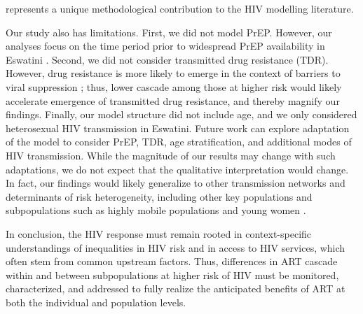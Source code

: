 represents a unique methodological contribution to the HIV modelling literature.
\par
Our study also has limitations.
First, we did not model PrEP.
However, our analyses focus on the time period
prior to widespread PrEP availability in Eswatini \cite{EswIBBS2022}.
Second, we did not consider transmitted drug resistance (TDR).
However, drug resistance is more likely to emerge
in the context of barriers to viral suppression \cite{Pham2014};
thus, lower cascade among those at higher risk
would likely accelerate emergence of transmitted drug resistance,
and thereby magnify our findings.
Finally, our model structure did not include age,
and we only considered heterosexual HIV transmission in Eswatini.
Future work can explore adaptation of the model to consider
PrEP, TDR, age stratification, and additional modes of HIV transmission.
While the magnitude of our results may change with such adaptations,
we do not expect that the qualitative interpretation would change.
In fact, our findings would likely generalize
to other transmission networks and determinants of risk heterogeneity,
including other key populations and subpopulations such as
highly mobile populations and young women \cite{Camlin2019,Cheuk2020}.
\par
In conclusion, the HIV response must remain rooted in
context-specific understandings of inequalities in HIV risk and in access to HIV services,
which often stem from common upstream factors.
Thus, differences in ART cascade within and between subpopulations at higher risk of HIV
must be monitored, characterized, and addressed
to fully realize the anticipated benefits of ART
at both the individual and population levels.
